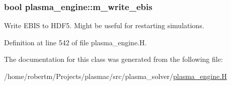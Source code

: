 \subsubsection[{\texorpdfstring{m\+\_\+write\+\_\+ebis}{m_write_ebis}}]{\setlength{\rightskip}{0pt plus 5cm}bool plasma\+\_\+engine\+::m\+\_\+write\+\_\+ebis\hspace{0.3cm}{\ttfamily [protected]}}\hypertarget{classplasma__engine_af9bb6854312d5fd2e8fbf131c0b596a9}{}\label{classplasma__engine_af9bb6854312d5fd2e8fbf131c0b596a9}


Write E\+B\+IS to H\+D\+F5. Might be useful for restarting simulations. 



Definition at line 542 of file plasma\+\_\+engine.\+H.



The documentation for this class was generated from the following file\+:\begin{DoxyCompactItemize}
\item 
/home/robertm/\+Projects/plasmac/src/plasma\+\_\+solver/\hyperlink{plasma__engine_8H}{plasma\+\_\+engine.\+H}\end{DoxyCompactItemize}
